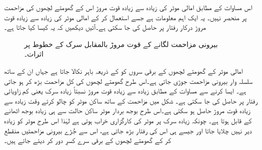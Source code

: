 اس مساوات کے مطابق امالی موٹر کی زیادہ سے زیادہ قوت مروڑ اس کے گھومتے لچھوں کی  مزاحمت پر منحصر نہیں۔ یہ ایک اہم معلومات ہے جسے استعمال کر کے امالی موٹر کی زیادہ سے زیادہ قوت مروڑ درکار رفتار پر  حاصل کی جا سکتی ہے۔آئیں دیکھیں کہ یہ کیسا کیا جاتا ہے۔
\begin{figure}
\centering
%
\caption{بیرونی مزاحمت لگانے کے قوت مروڑ بالمقابل سرک کے خطوط پر اثرات۔}
\label{شکل_امالی_بیرونی_مزاحمت_اور_مروٹ}
\end{figure}

	امالی موٹر کے گھومتے لچھوں کے برقی سروں کو  کے ذریعہ باہر نکالا جاتا ہے جہاں ان کے ساتھ سلسلہ وار بیرونی مزاحمت جوڑی جاتی ہے۔اس طرح گھومتے لچھوں کی کل مزاحمت بڑھ کر  ہو جاتی ہے۔ ایسا کرنے سے مساوات   کے مطابق زیادہ سے زیادہ قوت مروڑ نسبتاً زیادہ سرک یعنی کم زاویائی رفتار پر حاصل کی جا سکتی ہے۔ شکل  میں مزاحمت  کے ساتھ ساکن موٹر کو چالو کرتے وقت زیادہ سے زیادہ قوت مروڑ حاصل ہو سکتی ہے۔اس طرح بوجھ بردار موٹر ساکن حالت سے ہی زیادہ بوجھ اٹھانے کے قابل ہوتا ہے۔ چونکہ زیادہ سرک پر موٹر کی کارگزاری خراب ہوتی ہے لہٰذا اس طرح موٹر کو زیادہ دیر نہیں چلایا جاتا اور جیسے ہی اس کی رفتار بڑھ جاتی ہے، اس سے جُڑے بیرونی مزاحمتیں منقطع کر کے گھومتے لچھوں کے برقی سرے کسرِ دور کر دیئے جاتے ہیں۔

